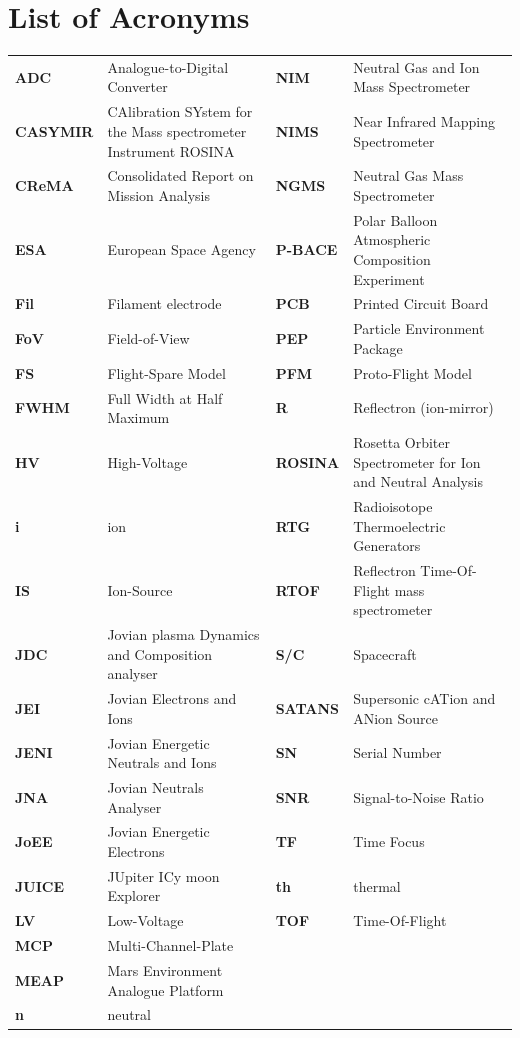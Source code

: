 \documentclass[a4paper, 12pt, abstracton]{scrartcl}
\begin{document}
	\section*{List of Acronyms}
	\begin{tabular}{>{\bfseries}l|l|>{\bfseries}l|l} %
		
		ADC		& Analogue-to-Digital Converter & NIM	  	& Neutral Gas and Ion Mass Spectrometer \\
		CASYMIR	& CAlibration SYstem for the Mass
				  spectrometer Instrument ROSINA & NIMS	& Near Infrared Mapping Spectrometer\\
		CReMA	& Consolidated Report on Mission Analysis & NGMS	& Neutral Gas Mass Spectrometer \\
		ESA		& European Space Agency & P-BACE	& Polar Balloon Atmospheric Composition Experiment \\
		Fil		& Filament electrode & PCB		& Printed Circuit Board \\
		FoV		& Field-of-View & PEP   	& Particle Environment Package \\
		FS		& Flight-Spare Model & PFM		& Proto-Flight Model \\
		FWHM  	& Full Width at Half Maximum & R		& Reflectron (ion-mirror) \\ 
		HV		& High-Voltage & ROSINA	& Rosetta Orbiter Spectrometer for Ion and Neutral Analysis\\
		i		& ion & RTG		& Radioisotope Thermoelectric Generators\\
		IS		& Ion-Source & RTOF	& Reflectron Time-Of-Flight mass spectrometer\\
		JDC		& Jovian plasma Dynamics and Composition analyser & S/C		& Spacecraft \\
		JEI		& Jovian Electrons and Ions & SATANS	& Supersonic cATion and ANion Source \\
		JENI	& Jovian Energetic Neutrals and Ions & SN		& Serial Number \\
		JNA		& Jovian Neutrals Analyser & SNR		& Signal-to-Noise Ratio \\
		JoEE	& Jovian Energetic Electrons & 	TF		& Time Focus \\
		JUICE 	& JUpiter ICy moon Explorer & th		& thermal \\ 
		LV 		& Low-Voltage & TOF		& Time-Of-Flight \\
		MCP		& Multi-Channel-Plate & &\\
		MEAP	& Mars Environment Analogue Platform & & \\
		n		& neutral & & \\
		
	\end{tabular}
	\newpage
	\thispagestyle{empty}
	\null
	\newpage
	
\end{document}
